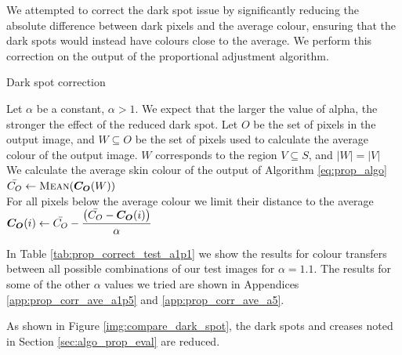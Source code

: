 We attempted to correct the dark spot issue by significantly reducing the absolute difference between dark pixels and the average colour, ensuring that the dark spots would instead have colours close to the average. We perform this correction on the output of the proportional adjustment algorithm.

\begin{algorithm}[H]
\caption{Dark spot correction}
\label{eq:prop_corr_algo}
\begin{algorithmic}
\State Let $\alpha$ be a constant, $\alpha  > 1$. We expect that the larger the value of alpha, the stronger the effect of the reduced dark spot.
\State Let $O$ be the set of pixels in the output image, and $W \subseteq O$ be the set of pixels used to calculate the average colour of the output image. $W$ corresponds to the region $V \subseteq S$, and $\left|W\right| = \left|V\right|$ \\
\State We calculate the average skin colour of the output of Algorithm \ref{eq:prop_algo}
\State $\mean{C_O} \gets \Call{Mean}{\vect{C_O}(W)}$\\
\State For all pixels below the average colour we limit their distance to the average 
\State $\boldsymbol{C_O}(i) \gets \displaystyle \bar{C_O} - \frac{\left(\bar{C_O} - \boldsymbol{C_O}(i)\right)}{\alpha}$
\EndIf
\EndFor
\end{algorithmic}
\end{algorithm}


In Table \ref{tab:prop_correct_test_a1p1} we show the results for colour transfers between all possible combinations of our test images for $\alpha = 1.1$. The results for some of the other $\alpha$ values we tried are shown in Appendices \ref{app:prop_corr_ave_a1p5} and \ref{app:prop_corr_ave_a5}.



As shown in Figure \ref{img:compare_dark_spot}, the dark spots and creases noted in Section \ref{sec:algo_prop_eval} are reduced.

